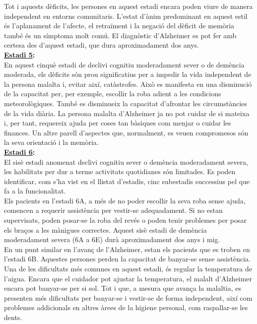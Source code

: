 \documentclass[a4paper,12pt]{report}
\begin{document}
Tot i aquests dèficits, les persones en aquest estadi encara poden viure de manera independent en entorns comunitaris. L'estat d'ànim predominant en aquest estil és l'aplanament de l'afecte, el retraïment i la negació del dèficit de memòria també és un símptoma molt comú. El diagnòstic d'Alzheimer es pot fer amb certesa des d'aquest estadi, que dura aproximadament dos anys.\\
\textbf{\underline{Estadi 5}:}\\
En aquest cinquè estadi de declivi cognitiu moderadament sever o de demència moderada, els dèficits són prou significatius per a impedir la vida independent de la persona malalta i, evitar així, catàstrofes. Això es manifesta en una disminució de la capacitat per, per exemple, escollir la roba adient a les condicions meteorològiques. També es disminueix la capacitat d'afrontar les circumstàncies de la vida diària. La persona malalta d'Alzheimer ja no pot cuidar de si mateixa i, per tant, requereix ajuda per coses tan bàsiques com menjar o cuidar les finances. Un altre parell d'aspectes que, normalment, es veuen compromesos són la seva orientació i la memòria.\\
\textbf{\underline{Estadi 6}:}\\
El sisè estadi anomenat declivi cognitiu sever o demència moderadament severa, les habilitats per dur a terme activitats quotidianes són limitades. Es poden identificar, com s'ha vist en el llistat d'estadis, cinc subestadis successius pel que fa a la funcionalitat.\\
Els pacients en l'estadi 6A, a més de no poder escollir la seva roba sense ajuda, comencen a requerir assistència per vestir-se adequadament. Si no estan supervisats, poden posar-se la roba del revés o poden tenir problemes per posar els braços a les mànigues correctes. Aquest sisè estadi de demència moderadament severa (6A a 6E) durà aproximadament dos anys i mig.\\
En un punt similar en l'avanç de l'Alzheimer, estan els pacients que es troben en l'estadi 6B. Aquestes persones perden la capacitat de banyar-se sense assistència. Una de les dificultats més comunes en aquest estadi, és regular la temperatura de l'aigua. Encara que el cuidador pot ajustar la temperatura, el malalt d'Alzheimer encara pot banyar-se per si sol. Tot i que, a mesura que avança la malaltia, es presenten més dificultats per banyar-se i vestir-se de forma independent, així com problemes addicionals en altres àrees de la higiene personal, com raspallar-se les dents.\\
\end{document}
